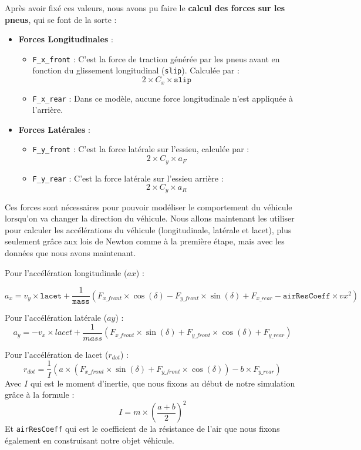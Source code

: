 Après avoir fixé ces valeurs, nous avons pu faire le \textbf{calcul des forces sur les pneus}, qui se font de la sorte :
\begin{itemize}
    \item \textbf{Forces Longitudinales} :
    \begin{itemize}[label=$\star$]
        \item \texttt{F\_x\_front} : C'est la force de traction générée par les pneus avant en fonction du glissement longitudinal (\texttt{slip}). Calculée par : $$2 \times C_x \times \texttt{slip}$$

        \item \texttt{F\_x\_rear} : Dans ce modèle, aucune force longitudinale n'est appliquée à l'arrière.
    \end{itemize}
    \item \textbf{Forces Latérales} :
    \begin{itemize}[label=$\star$]
        \item \texttt{F\_y\_front} : C'est la force latérale sur l'\gls{essieu}, calculée par : $$2 \times C_y \times a_F$$
        \item \texttt{F\_y\_rear} : C'est la force latérale sur l'\gls{essieu} arrière : $$2 \times C_y \times a_R$$
    \end{itemize}
\end{itemize}

Ces forces sont nécessaires pour pouvoir modéliser le comportement du véhicule lorsqu'on va changer la direction du véhicule.
Nous allons maintenant les utiliser pour calculer les accélérations du véhicule (longitudinale, latérale et lacet), plus seulement grâce aux lois de Newton comme à la première étape, mais avec les données que nous avons maintenant.

Pour l'accélération longitudinale ($ax$) :


$$a_x = v_y \times \texttt{lacet} + \frac{1}{\texttt{mass}}(F_{x\_front} \times \cos(\delta) - F_{y\_front} \times \sin(\delta) + F_{x\_rear} - \texttt{airResCoeff} \times vx^2)$$

Pour l'accélération latérale ($ay$) :
$$a_y=-v_x\times lacet + \frac{1}{mass}(F_{x\_front} \times \sin(\delta) + F_{y\_front} \times \cos(\delta) + F_{y\_rear})$$

Pour l'accélération de lacet ($r_{dot}$) :
$$r_{dot} = \frac{1}{I}(a \times (F_{x\_front} \times \sin(\delta) + F_{y\_front} \times \cos(\delta)) - b \times F_{y\_rear})$$
Avec $I$ qui est le moment d'inertie, que nous fixons au début de notre simulation grâce à la formule : $$I = m \times ({\frac{{a+b}}{2}})^2$$
Et \texttt{airResCoeff} qui est le coefficient de la résistance de l'air que nous fixons également en construisant notre objet véhicule. \newline

